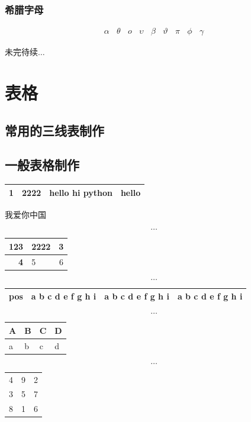 \documentclass{ctexart}
\begin{document}
\subsubsection{希腊字母}
\begin{gather}
\alpha~~~~\theta~~~~o~~~~\upsilon~~~~\beta~~~~\vartheta~~~~\pi~~~~\phi~~~~\gamma
\end{gather}

未完待续$\dots$
\section{表格}
\subsection{常用的三线表制作}


\subsection{一般表格制作}
\begin{tabular}{|*{2}{c|}m{6em}|m{4em}|}
\hline
1&2222&hello hi python & hello \\
\hline
\end{tabular}
我爱你中国

\[\dots\]

\begin{tabular}{>{\bfseries}rlc}
\hline
123&2222&3 \\
\hline
4&5&6 \\
\hline
\end{tabular}

\[\dots\]

\newcommand\txt
   {a b c d e f g h i}
\begin{tabular}{cp{2em}m{2em}b{2em}}
\hline
pos & \txt & \txt & \txt \\
\hline
\end{tabular}

\[\dots\]

\begin{tabularx}{18em}{|*{4}{>{\centering\arraybackslash}X|}}
\hline
A & B & C & D \\ \hline
a & b & c & d \\ \hline
\end{tabularx}

\[\dots\]

\begin{tabular}{|c|c|c|}
\hline
4 & 9 & 2 \\ \cline{2-3}
3 & 5 & 7 \\ \cline{1-1}
8 & 1 & 6 \\ \hline
\end{tabular}
\end{document}
